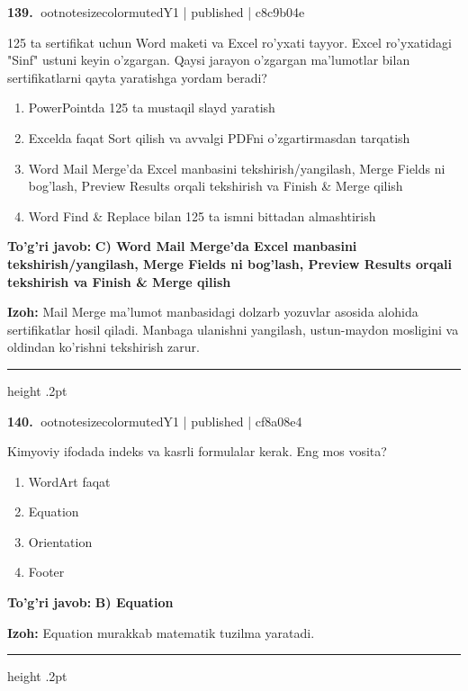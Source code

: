\documentclass[10pt,a4paper]{article}
\begin{document}
\textbf{\color{ink}139.} {ootnotesizecolor{muted}Y1 | published | c8c9b04e}
\par
125 ta sertifikat uchun Word maketi va Excel ro'yxati tayyor. Excel ro'yxatidagi "Sinf" ustuni keyin o'zgargan. Qaysi jarayon o'zgargan ma'lumotlar bilan sertifikatlarni qayta yaratishga yordam beradi?
\begin{enumerate}[label=\Alph*),leftmargin=9mm]
\item PowerPointda 125 ta mustaqil slayd yaratish
\item Excelda faqat Sort qilish va avvalgi PDFni o'zgartirmasdan tarqatish
\item Word Mail Merge'da Excel manbasini tekshirish/yangilash, Merge Fields ni bog'lash, Preview Results orqali tekshirish va Finish \& Merge qilish
\item Word Find \& Replace bilan 125 ta ismni bittadan almashtirish
\end{enumerate}
\begin{tcolorbox}[enhanced,breakable,colback=teal!4,colframe=teal!55!black,boxrule=0.45pt,arc=1.2mm,left=2.8mm,right=2.8mm,top=2mm,bottom=2mm]
\textbf{\color{teal}To'g'ri javob:} \textbf{C) Word Mail Merge'da Excel manbasini tekshirish/yangilash, Merge Fields ni bog'lash, Preview Results orqali tekshirish va Finish \& Merge qilish}
\par\smallskip
\textbf{Izoh:} Mail Merge ma'lumot manbasidagi dolzarb yozuvlar asosida alohida sertifikatlar hosil qiladi. Manbaga ulanishni yangilash, ustun-maydon mosligini va oldindan ko'rishni tekshirish zarur.
\end{tcolorbox}
\vspace{2mm}\hrule height .2pt\vspace{2mm}

\textbf{\color{ink}140.} {ootnotesizecolor{muted}Y1 | published | cf8a08e4}
\par
Kimyoviy ifodada indeks va kasrli formulalar kerak. Eng mos vosita?
\begin{enumerate}[label=\Alph*),leftmargin=9mm]
\item WordArt faqat
\item Equation
\item Orientation
\item Footer
\end{enumerate}
\begin{tcolorbox}[enhanced,breakable,colback=teal!4,colframe=teal!55!black,boxrule=0.45pt,arc=1.2mm,left=2.8mm,right=2.8mm,top=2mm,bottom=2mm]
\textbf{\color{teal}To'g'ri javob:} \textbf{B) Equation}
\par\smallskip
\textbf{Izoh:} Equation murakkab matematik tuzilma yaratadi.
\end{tcolorbox}
\vspace{2mm}\hrule height .2pt\vspace{2mm}
\end{document}
